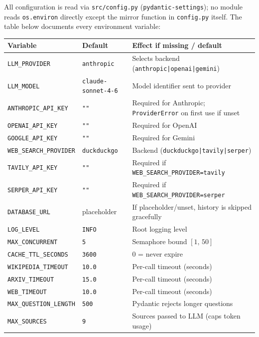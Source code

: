 \documentclass[11pt,a4paper]{article}
\begin{document}
All configuration is read via \texttt{src/config.py} (\texttt{pydantic-settings}); no
module reads \texttt{os.environ} directly except the mirror function in
\texttt{config.py} itself. The table below documents every environment variable:

\begin{center}\small
\begin{tabular}{@{}l@{\hspace{6pt}}l@{\hspace{6pt}}p{5.5cm}@{}}
\toprule
\textbf{Variable} & \textbf{Default} & \textbf{Effect if missing / default} \\
\midrule
\texttt{LLM\_PROVIDER}         & \texttt{anthropic}
  & Selects backend (\texttt{anthropic|openai|gemini}) \\
\texttt{LLM\_MODEL}            & \texttt{claude-sonnet-4-6}
  & Model identifier sent to provider \\
\texttt{ANTHROPIC\_API\_KEY}   & \texttt{""}
  & Required for Anthropic; \texttt{ProviderError} on first use if unset \\
\texttt{OPENAI\_API\_KEY}      & \texttt{""}
  & Required for OpenAI \\
\texttt{GOOGLE\_API\_KEY}      & \texttt{""}
  & Required for Gemini \\
\texttt{WEB\_SEARCH\_PROVIDER} & \texttt{duckduckgo}
  & Backend (\texttt{duckduckgo|tavily|serper}) \\
\texttt{TAVILY\_API\_KEY}      & \texttt{""}
  & Required if \texttt{WEB\_SEARCH\_PROVIDER=tavily} \\
\texttt{SERPER\_API\_KEY}      & \texttt{""}
  & Required if \texttt{WEB\_SEARCH\_PROVIDER=serper} \\
\texttt{DATABASE\_URL}         & placeholder
  & If placeholder/unset, history is skipped gracefully \\
\texttt{LOG\_LEVEL}            & \texttt{INFO}
  & Root logging level \\
\texttt{MAX\_CONCURRENT}       & \texttt{5}
  & Semaphore bound $[1,\,50]$ \\
\texttt{CACHE\_TTL\_SECONDS}   & \texttt{3600}
  & 0 = never expire \\
\texttt{WIKIPEDIA\_TIMEOUT}    & \texttt{10.0}
  & Per-call timeout (seconds) \\
\texttt{ARXIV\_TIMEOUT}        & \texttt{15.0}
  & Per-call timeout (seconds) \\
\texttt{WEB\_TIMEOUT}          & \texttt{10.0}
  & Per-call timeout (seconds) \\
\texttt{MAX\_QUESTION\_LENGTH} & \texttt{500}
  & Pydantic rejects longer questions \\
\texttt{MAX\_SOURCES}          & \texttt{9}
  & Sources passed to LLM (caps token usage) \\
\bottomrule
\end{tabular}
\end{center}
\end{document}
